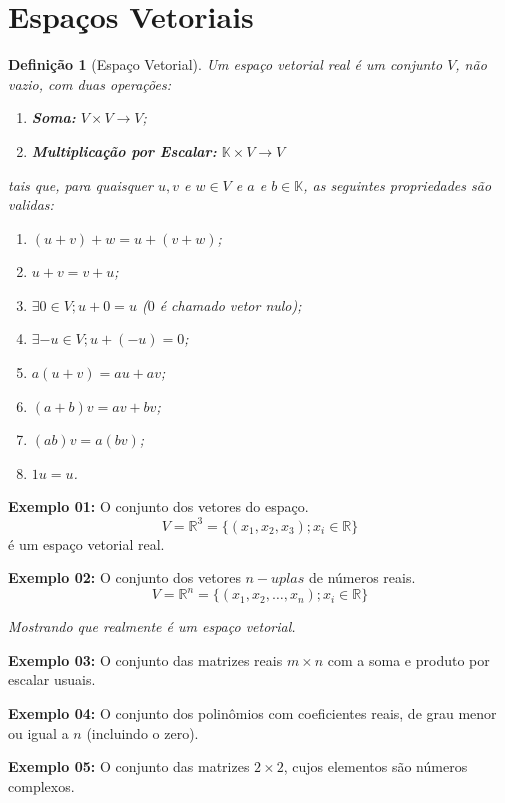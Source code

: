 \documentclass[oneside,a4paper,12pt]{article}
\newtheorem{definition}{Definição}[section]
\begin{document}
\newpage

\section{Espaços Vetoriais}

\begin{definition}[Espaço Vetorial]
	Um espaço vetorial real é um conjunto $V$, não vazio, com duas operações:
	\begin{enumerate}
		\item {\bf Soma:} $V \times V \rightarrow V$;
		\item {\bf Multiplicação por Escalar:} $\mathbb{K} \times V \rightarrow V$
	\end{enumerate}
	tais que, para quaisquer $u,v$ e $w \in V$ e $a$ e $b \in \mathbb{K}$, as seguintes propriedades são validas:
	\begin{enumerate}
		\item $(u+v) + w = u + (v + w)$;
		\item $u + v = v + u$;
		\item $\exists 0 \in V; u + 0 = u$ ($0$ é chamado vetor nulo);
		\item $\exists -u \in V; u + (-u) = 0$;
		\item $a(u + v) = au + av$;
		\item $(a + b)v = av + bv$;
		\item $(ab)v = a(bv)$;
		\item $1u = u$.
	\end{enumerate}
\end{definition}

{\bf Exemplo 01:} O conjunto dos vetores do espaço.
$$V = \mathbb{R}^3 = \{ (x_1, x_2, x_3); x_i \in \mathbb{R}\}$$
é um espaço vetorial real.

{\bf Exemplo 02:} O conjunto dos vetores $n-uplas$ de números reais.
$$V = \mathbb{R}^n = \{ (x_1, x_2, \dots, x_n); x_i \in \mathbb{R}\}$$

\emph{Mostrando que realmente é um espaço vetorial.}

\vspace{100pt}

{\bf Exemplo 03:} O conjunto das matrizes reais $m \times n$ com a soma e produto por escalar usuais.

{\bf Exemplo 04:} O conjunto dos polinômios com coeficientes reais, de grau menor ou igual a $n$ (incluindo o zero).

{\bf Exemplo 05:} O conjunto das matrizes $2 \times 2$, cujos elementos são números complexos.
\end{document}

